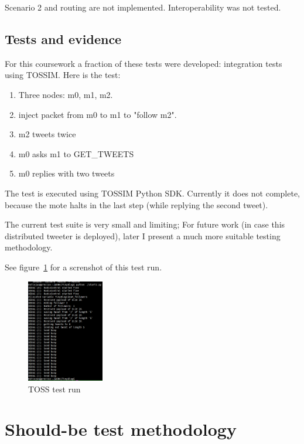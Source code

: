 \documentclass[english,11pt]{article}
\numberwithin{equation}{section}
\begin{document}
Scenario 2 and routing are not implemented. Interoperability was not tested.

\subsection{Tests and evidence}

For this coursework a fraction of these tests were developed: integration tests
using TOSSIM. Here is the test:

\begin{enumerate}
    \item Three nodes: m0, m1, m2.
    \item inject packet from m0 to m1 to "follow m2".
    \item m2 tweets twice
    \item m0 asks m1 to GET\_TWEETS
    \item m0 replies with two tweets
\end{enumerate}

The test is executed using TOSSIM Python SDK. Currently it does not complete,
because the mote halts in the last step (while replying the second tweet).

The current test suite is very small and limiting; For future work (in case this
distributed tweeter is deployed), later I present a much more suitable testing
methodology.

See figure~\ref{fig:test_suite} for a screnshot of this test run.

\begin{figure}
    \centering
    \includegraphics[width=0.3\textwidth]{test_suite.png}
    \caption{TOSS test run}
    \label{fig:test_suite}
\end{figure}

\section{Should-be test methodology}
\end{document}
